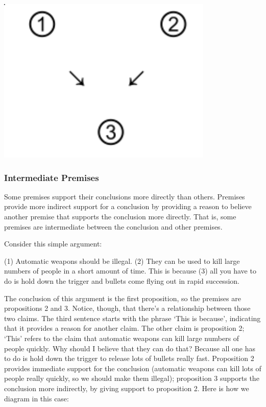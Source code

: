 \includegraphics[scale=.49]{diagram1.pdf}


\subsubsection{Intermediate Premises}
Some premises support their conclusions more directly than others. Premises provide more indirect
support for a conclusion by providing a reason to believe another premise that supports the
conclusion more directly. That is, some premises are intermediate between the conclusion and
other premises.

Consider this simple argument:

(1) Automatic weapons should be illegal. (2) They can be used to kill large numbers of
people in a short amount of time. This is because (3) all you have to do is hold down the
trigger and bullets come flying out in rapid succession.

The conclusion of this argument is the first proposition, so the premises are propositions 2 and 3.
Notice, though, that there's a relationship between those two claims. The third sentence starts with
the phrase `This is because', indicating that it provides a reason for another claim. The other claim
is proposition 2; `This' refers to the claim that automatic weapons can kill large numbers of people
quickly. Why should I believe that they can do that? Because all one has to do is hold down the
trigger to release lots of bullets really fast. Proposition 2 provides immediate support for the
conclusion (automatic weapons can kill lots of people really quickly, so we should make them
illegal); proposition 3 supports the conclusion more indirectly, by giving support to proposition 2.
Here is how we diagram in this case: \\

